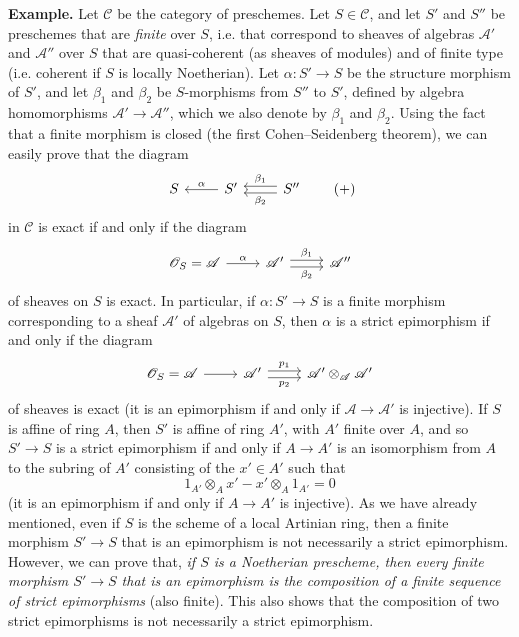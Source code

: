 \documentclass{article}
\newenvironment{rmenv}[1]
  {\phantomsection\par\medskip\noindent\textbf{#1.}\rmfamily}
  {\medskip}
\newcommand{\scr}[1]{{\mathscr{#1}}}
\renewcommand{\cal}[1]{{\mathcal{#1}}}
\newcommand{\oldpage}[1]{\marginpar{\footnotesize$\Big\vert$ \textit{p.~#1}}}
\begin{document}
\begin{rmenv}{Example}
  Let $\cal{C}$ be the category of preschemes.
  Let $S\in\cal{C}$, and let $S'$ and $S''$ be preschemes that are \emph{finite} over $S$, i.e. that correspond to sheaves of algebras $\scr{A}'$ and $\scr{A}''$ over $S$ that are quasi-coherent (as sheaves of modules) and of finite type (i.e. coherent if $S$ is locally Noetherian).
  Let $\alpha\colon S'\to S$ be the structure morphism of $S'$, and let $\beta_1$ and $\beta_2$ be $S$-morphisms from $S''$ to $S'$, defined by algebra homomorphisms $\scr{A}'\to\scr{A}''$, which we also denote by $\beta_1$ and $\beta_2$.
  Using the fact that a finite morphism is closed (the first Cohen--Seidenberg theorem), we can easily prove that the diagram
  \[
  \label{equation-example:A.2.b}
    \begin{tikzcd}
      S
      & S' \lar[swap,"\alpha"]
      & S'' \lar[shift left=1,"\beta_2"] \lar[shift right=1,swap,"\beta_1"]
    \end{tikzcd}
  \tag{+}
  \]
  in $\cal{C}$ is exact if and only if the diagram
\oldpage{190-08}
  \[
    \begin{tikzcd}
      \scr{O}_S = \scr{A} \rar["\alpha"]
      & \scr{A}' \rar[shift left=1,"\beta_1"] \rar[shift right=1,swap,"\beta_2"]
      & \scr{A}''
    \end{tikzcd}
  \]
  of sheaves on $S$ is exact.
  In particular, if $\alpha\colon S'\to S$ is a finite morphism corresponding to a sheaf $\scr{A}'$ of algebras on $S$, then $\alpha$ is a strict epimorphism if and only if the diagram
  \[
    \begin{tikzcd}
      \scr{O}_S = \scr{A} \rar
      & \scr{A}' \rar[shift left=1,"p_1"] \rar[shift right=1,swap,"p_2"]
      & \scr{A}'\otimes_{\scr{A}}\scr{A}'
    \end{tikzcd}
  \]
  of sheaves is exact (it is an epimorphism if and only if $\scr{A}\to\scr{A}'$ is injective).
  If $S$ is affine of ring $A$, then $S'$ is affine of ring $A'$, with $A'$ finite over $A$, and so $S'\to S$ is a strict epimorphism if and only if $A\to A'$ is an isomorphism from $A$ to the subring of $A'$ consisting of the $x'\in A'$ such that
  \[
    1_{A'}\otimes_A x' - x'\otimes_A 1_{A'} = 0
  \]
  (it is an epimorphism if and only if $A\to A'$ is injective).
  As we have already mentioned, even if $S$ is the scheme of a local Artinian ring, then a finite morphism $S'\to S$ that is an epimorphism is not necessarily a strict epimorphism.
  However, we can prove that, \emph{if $S$ is a Noetherian prescheme, then every finite morphism $S'\to S$ that is an epimorphism is the composition of a finite sequence of strict epimorphisms} (also finite).
  This also shows that the composition of two strict epimorphisms is not necessarily a strict epimorphism.
\end{rmenv}
\end{document}
